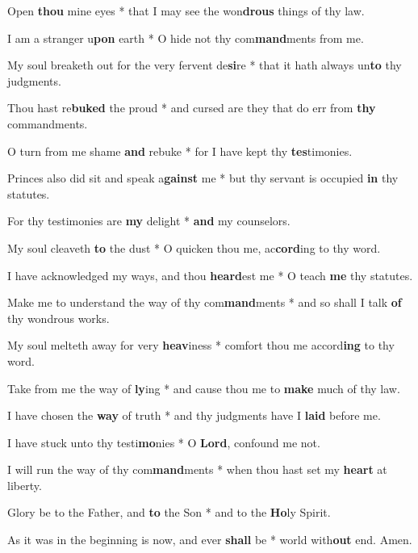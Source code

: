 \begin{multicols}{2}
	Open \textbf{thou} mine eyes * that I may see the won\textbf{drous} things of thy law.
	
	I am a stranger u\textbf{pon} earth * O hide not thy com\textbf{mand}ments from me.
	
	My soul breaketh out for the very fervent de\textbf{si}re * that it hath always un\textbf{to} thy judgments.
	
	Thou hast re\textbf{buked} the proud * and cursed are they that do err from \textbf{thy} commandments.
	
	O turn from me shame \textbf{and} rebuke * for I have kept thy \textbf{tes}timonies.
	
	Princes also did sit and speak a\textbf{gainst} me * but thy servant is occupied \textbf{in} thy statutes.
	
	For thy testimonies are \textbf{my} delight * \textbf{and} my counselors.
	
	My soul cleaveth \textbf{to} the dust * O quicken thou me, ac\textbf{cord}ing to thy word.
	
	I have acknowledged my ways, and thou \textbf{heard}est me * O teach \textbf{me} thy statutes.
	
	Make me to understand the way of thy com\textbf{mand}ments * and so shall I talk \textbf{of} thy wondrous works.
	
	My soul melteth away for very \textbf{heav}iness * comfort thou me accord\textbf{ing} to thy word.
	
	Take from me the way of \textbf{ly}ing * and cause thou me to \textbf{make} much of thy law.
	
	I have chosen the \textbf{way} of truth * and thy judgments have I \textbf{laid} before me.
	
	I have stuck unto thy testi\textbf{mo}nies * O \textbf{Lord}, confound me not.
	
	I will run the way of thy com\textbf{mand}ments * when thou hast set my \textbf{heart} at liberty.
	
	Glory be to the Father, and \textbf{to} the Son * and to the \textbf{Ho}ly Spirit.
	
	As it was in the beginning is now, and ever \textbf{shall} be * world with\textbf{out} end. Amen.
\end{multicols}